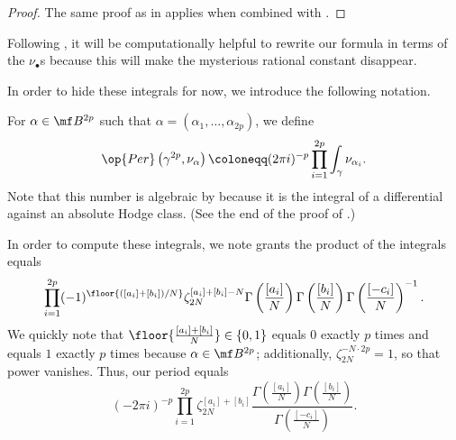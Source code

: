 \documentclass[../thesis.tex]{subfiles}
\begin{document}
\begin{proof}
	The same proof as in  applies when combined with .
\end{proof}
\begin{remark}
	Following , it will be computationally helpful to rewrite our formula in terms of the $\nu_\bullet$s because this will make the mysterious rational constant disappear.
\end{remark}
In order to hide these integrals for now, we introduce the following notation.
\begin{notation}
	For $\alpha\in\mf B^{2p}$ such that $\alpha=(\alpha_1,\ldots,\alpha_{2p})$, we define
	\[\op{Per}\left(\gamma^{2p},\nu_{\alpha}\right)\coloneqq(2\pi i)^{-p}\prod_{i=1}^{2p}\int_\gamma\nu_{\alpha_i}.\]
	Note that this number is algebraic by  because it is the integral of a differential against an absolute Hodge class. (See the end of the proof of .)
\end{notation}
\begin{remark} \label{rem:iterated-coleman-period}
	In order to compute these integrals, we note  grants the product of the integrals equals
	\[\prod_{i=1}^{2p}(-1)^{\floor{([a_i]+[b_i])/N}}\zeta_{2N}^{[a_i]+[b_i]-N}\Gamma\left(\frac{[a_i]}N\right)\Gamma\left(\frac{[b_i]}N\right)\Gamma\left(\frac{[-c_i]}N\right)^{-1}.\]
	We quickly note that $\floor{\frac{[a_i]+[b_i]}N}\in\{0,1\}$ equals $0$ exactly $p$ times and equals $1$ exactly $p$ times because $\alpha\in\mf B^{2p}$; additionally, $\zeta_{2N}^{-N\cdot2p}=1$, so that power vanishes. Thus, our period equals
	\[(-2\pi i)^{-p}\prod_{i=1}^{2p}\zeta_{2N}^{[a_i]+[b_i]}\frac{\Gamma\left(\frac{[a_i]}N\right)\Gamma\left(\frac{[b_i]}N\right)}{\Gamma\left(\frac{[-c_i]}N\right)}.\]
\end{remark}
\end{document}
